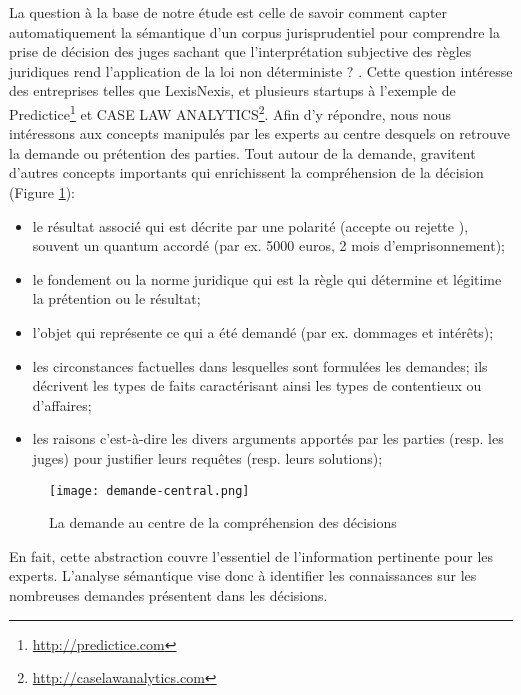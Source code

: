  La question à la base de notre étude est celle de savoir \og comment capter automatiquement la sémantique d'un corpus jurisprudentiel pour comprendre la prise de décision des juges sachant que l'interprétation subjective des règles juridiques rend l'application de la loi non déterministe ? \fg{}. Cette question intéresse des entreprises telles que LexisNexis, et plusieurs startups  à l'exemple de Predictice\footnote{\url{http://predictice.com}} et CASE LAW ANALYTICS\footnote{\url{http://caselawanalytics.com}}. Afin d'y répondre, nous nous intéressons  aux concepts manipulés par les experts au centre desquels on retrouve la demande ou prétention des parties. Tout autour de la demande, gravitent d'autres concepts importants qui enrichissent la compréhension de la décision (Figure \ref{fig:intro:demande-central}): 
 \begin{itemize}
	\item le résultat associé qui est décrite par une polarité (\og accepte \fg{} ou \og rejette \fg{}), souvent un quantum accordé (par ex. 5000 euros, 2 mois d'emprisonnement);
	\item le fondement ou la norme juridique qui est la règle qui détermine et légitime la prétention ou le résultat;	
	\item l'objet qui représente ce qui a été demandé (par ex. dommages et intérêts);
	\item les circonstances factuelles 	dans lesquelles sont formulées les demandes; ils décrivent les types de faits caractérisant ainsi les types de contentieux ou d'affaires;
	\item les raisons c'est-à-dire les divers arguments apportés par les parties (resp. les juges) pour justifier leurs requêtes (resp. leurs solutions);
 \end{itemize}

\begin{figure}
    \centering
    \texttt{[image: demande-central.png]}
    \caption{La demande au centre de la compréhension des décisions}
    \label{fig:intro:demande-central}
\end{figure}

En fait, cette abstraction couvre l'essentiel de l'information pertinente pour les experts.  L'analyse sémantique vise donc à identifier les connaissances sur les nombreuses demandes présentent dans les décisions. 


